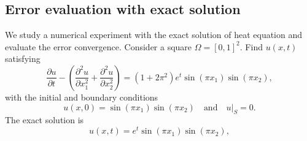 \subsection{Error evaluation with exact solution}
\quad We study a numerical experiment with the exact solution of heat equation and evaluate the error convergence. Consider a square $\Omega = [0,1]^2$. Find $u(x, t)$ satisfying
\begin{equation}
	\dfrac{\partial u}{\partial t} - \left(\dfrac{\partial^2 u}{\partial x_1^2} + \dfrac{\partial^2u}{\partial x_2^2}\right) = (1+2\pi^2)e^t\sin(\pi x_1) \sin(\pi x_2),
\end{equation}
with the initial and boundary conditions
$$ u(x, 0) = \sin(\pi x_1)\sin(\pi x_2) \quad \text{and} \quad u|_S = 0.$$
The exact solution is
$$u(x, t) = e^t\sin(\pi x_1) \sin(\pi x_2), $$

